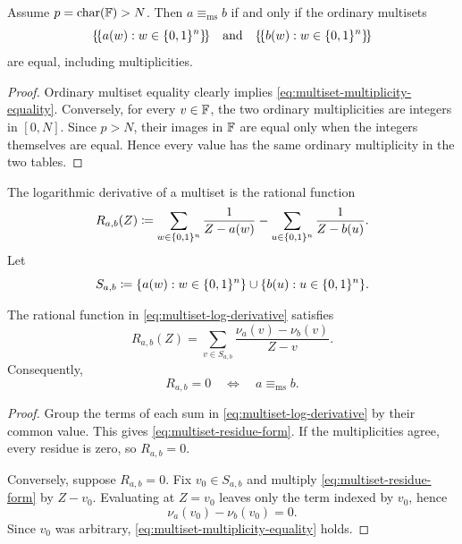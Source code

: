 \begin{proposition}
\label{prop:ordinary-multiset-equality}
Assume $p=\operatorname{char}(\mathbb{F})>N$.  Then $a\equiv_{\mathrm{ms}}b$ if and only if the ordinary multisets
\begin{equation}
  \{\!\{a(w):w\in\{0,1\}^n\}\!\}
  \quad\text{and}\quad
  \{\!\{b(w):w\in\{0,1\}^n\}\!\}
  \label{eq:ordinary-multisets}
\end{equation}
are equal, including multiplicities.
\end{proposition}

\begin{proof}
Ordinary multiset equality clearly implies \eqref{eq:multiset-multiplicity-equality}.  Conversely, for every $v\in\mathbb{F}$, the two ordinary multiplicities are integers in $[0,N]$.  Since $p>N$, their images in $\mathbb{F}$ are equal only when the integers themselves are equal.  Hence every value has the same ordinary multiplicity in the two tables.
\end{proof}

The logarithmic derivative of a multiset is the rational function
\begin{equation}
  R_{a,b}(Z)
  \coloneqq
  \sum_{w\in\{0,1\}^n}\frac{1}{Z-a(w)}
  -
  \sum_{u\in\{0,1\}^n}\frac{1}{Z-b(u)}.
  \label{eq:multiset-log-derivative}
\end{equation}
Let
\begin{equation}
  S_{a,b}\coloneqq
  \{a(w):w\in\{0,1\}^n\}\cup
  \{b(u):u\in\{0,1\}^n\}.
  \label{eq:multiset-poles}
\end{equation}

\begin{lemma}
\label{lem:multiset-residue-characterization}
The rational function in \eqref{eq:multiset-log-derivative} satisfies
\begin{equation}
  R_{a,b}(Z)
  =
  \sum_{v\in S_{a,b}}
  \frac{\nu_a(v)-\nu_b(v)}{Z-v}.
  \label{eq:multiset-residue-form}
\end{equation}
Consequently,
\begin{equation}
  R_{a,b}=0
  \quad\Longleftrightarrow\quad
  a\equiv_{\mathrm{ms}}b.
  \label{eq:multiset-rational-characterization}
\end{equation}
\end{lemma}

\begin{proof}
Group the terms of each sum in \eqref{eq:multiset-log-derivative} by their common value.  This gives \eqref{eq:multiset-residue-form}.  If the multiplicities agree, every residue is zero, so $R_{a,b}=0$.

Conversely, suppose $R_{a,b}=0$.  Fix $v_0\in S_{a,b}$ and multiply \eqref{eq:multiset-residue-form} by $Z-v_0$.  Evaluating at $Z=v_0$ leaves only the term indexed by $v_0$, hence
\[
  \nu_a(v_0)-\nu_b(v_0)=0.
\]
Since $v_0$ was arbitrary, \eqref{eq:multiset-multiplicity-equality} holds.
\end{proof}

